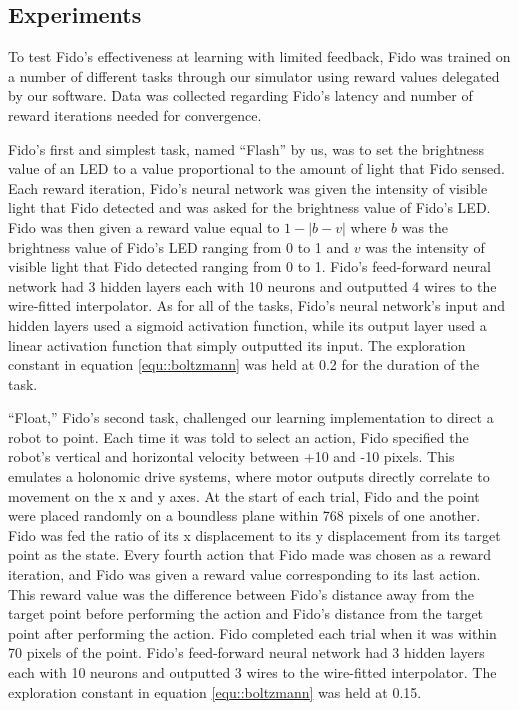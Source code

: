 \subsection{Experiments}

To test Fido's effectiveness at learning with limited feedback, Fido was trained on a number of different tasks through our simulator using reward values delegated by our software. Data was collected regarding Fido's latency and number of reward iterations needed for convergence.

Fido's first and simplest task, named ``Flash'' by us, was to set the brightness value of an LED to a value proportional to the amount of light that Fido sensed. Each reward iteration, Fido's neural network was given the intensity of visible light that Fido detected and was asked for the brightness value of Fido's LED. Fido was then given a reward value equal to $1 - |b - v|$ where $b$ was the brightness value of Fido's LED ranging from 0 to 1 and $v$ was the intensity of visible light that Fido detected ranging from 0 to 1. Fido's feed-forward neural network had 3 hidden layers each with 10 neurons and outputted 4 wires to the wire-fitted interpolator. As for all of the tasks, Fido's neural network's input and hidden layers used a sigmoid activation function, while  its output layer used a linear activation function that simply outputted its input. The exploration constant in equation \ref{equ::boltzmann} was held at 0.2 for the duration of the task.

``Float,'' Fido's second task, challenged our learning implementation to direct a robot to point. Each time it was told to select an action, Fido specified the robot's vertical and horizontal velocity between +10 and -10 pixels. This emulates a holonomic drive systems, where motor outputs directly correlate to movement on the x and y axes. At the start of each trial, Fido and the point were placed randomly on a boundless plane within 768 pixels of one another. Fido was fed the ratio of its x displacement to its y displacement from its target point as the state. Every fourth action that Fido made was chosen as a reward iteration, and Fido was given a reward value corresponding to its last action. This reward value was the difference between Fido's distance away from the target point before performing the action and Fido's distance from the target point after performing the action. Fido completed each trial when it was within 70 pixels of the point. Fido's feed-forward neural network had 3 hidden layers each with 10 neurons and outputted 3 wires to the wire-fitted interpolator. The exploration constant in equation \ref{equ::boltzmann} was held at 0.15.

